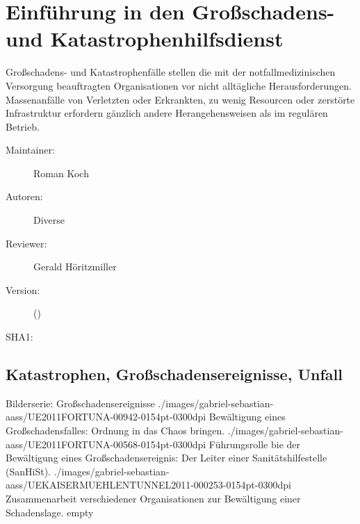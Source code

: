\def\ChapterCode{KHD}
\chapter
[\CO{[KHD]} Einführung in den Gro{\ss}schadens- und Katastrophenhilfsdienst]
{Einführung in den Gro{\ss}schadens- und Katastrophenhilfsdienst}
\label{chp:KHD}

\ChapterIntro
{%
Großschadens- und Katastrophenfälle stellen die mit der
notfallmedizinischen Versorgung beauftragten Organisationen
vor nicht alltägliche Herausforderungen. 
Massenanfälle von Verletzten oder Erkrankten, zu wenig
Resourcen oder zerstörte Infrastruktur erfordern gänzlich
andere Herangehensweisen als im regulären Betrieb. 

}
{%
\begin{description}
  \item[Maintainer:] Roman Koch
  \item[Autoren:] Diverse
  \item[Reviewer:] Gerald Höritzmiller
  \item[Version:] {\DocVersion} ({\DocVersionInfo})
  \item[SHA1:] {\DocGitCommit}
\end{description}

{\TxTeilkapitelAASS}
}

\section{Katastrophen, Großschadensereignisse, Unfall}



\begin{PictureSeriesWide}{}
{Bilderserie: Großschadensereignisse}
{./images/gabriel-sebastian-aass/UE2011FORTUNA-00942-0154pt-0300dpi}
{Bewältigung eines Großschadensfalles: Ordnung in das Chaos
bringen.}
{./images/gabriel-sebastian-aass/UE2011FORTUNA-00568-0154pt-0300dpi}
{Führungsrolle bie der Bewältigung eines
Großschadensereignis: Der Leiter einer Sanitätshilfestelle (SanHiSt). } {./images/gabriel-sebastian-aass/UEKAISERMUEHLENTUNNEL2011-000253-0154pt-0300dpi}
{Zusammenarbeit verschiedener Organisationen zur Bewältigung einer Schadenslage. }
{empty}
{}
\end{PictureSeriesWide}





